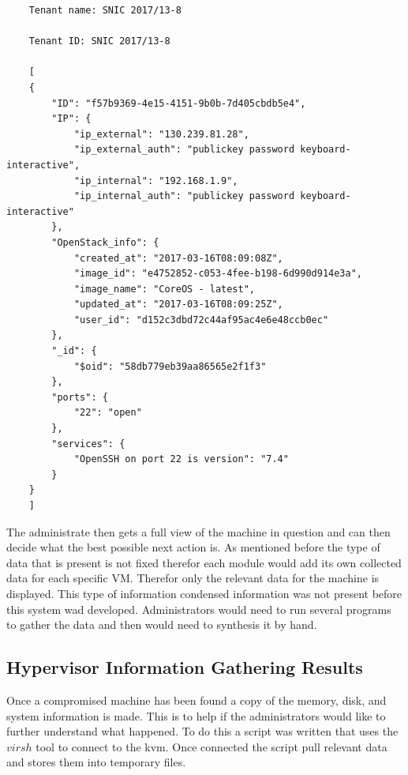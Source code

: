 \documentclass[12pt]{article}
\begin{document}
\begin{mdframed}
\begin{lstlisting}
    Tenant name: SNIC 2017/13-8

    Tenant ID: SNIC 2017/13-8

    [
    {
        "ID": "f57b9369-4e15-4151-9b0b-7d405cbdb5e4",
        "IP": {
            "ip_external": "130.239.81.28",
            "ip_external_auth": "publickey password keyboard-interactive",
            "ip_internal": "192.168.1.9",
            "ip_internal_auth": "publickey password keyboard-interactive"
        },
        "OpenStack_info": {
            "created_at": "2017-03-16T08:09:08Z",
            "image_id": "e4752852-c053-4fee-b198-6d990d914e3a",
            "image_name": "CoreOS - latest",
            "updated_at": "2017-03-16T08:09:25Z",
            "user_id": "d152c3dbd72c44af95ac4e6e48ccb0ec"
        },
        "_id": {
            "$oid": "58db779eb39aa86565e2f1f3"
        },
        "ports": {
            "22": "open"
        },
        "services": {
            "OpenSSH on port 22 is version": "7.4"
        }
    }
    ]
\end{lstlisting}
\end{mdframed}

The administrate then gets a full view of the machine in question and can then decide what the best possible next action is. As mentioned before the type of data that is present is not fixed therefor each module would add its own collected data for each specific VM. Therefor only the relevant data for the machine is displayed. This type of information condensed information was not present before this system wad developed. Administrators would need to run several programs to gather the data and then would need to synthesis it by hand.

\subsection{Hypervisor Information Gathering Results}
Once a compromised machine has been found a copy of the memory, disk, and system information is made. This is to help if the administrators would like to further understand what happened. To do this a script was written that uses the $virsh$ tool to connect to the kvm. Once connected the script pull relevant data and stores them into temporary files. 
\end{document}
